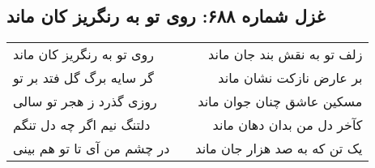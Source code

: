 \begin{center}
\section*{غزل شماره ۶۸۸: روی تو به رنگریز کان ماند}
\label{sec:0688}
\begin{longtable}{l p{0.5cm} r}
روی تو به رنگریز کان ماند
&&
زلف تو به نقش بند جان ماند
\\
گر سایه برگ گل فتد بر تو
&&
بر عارض نازکت نشان ماند
\\
روزی گذرد ز هجر تو سالی
&&
مسکین عاشق چنان جوان ماند
\\
دلتنگ نیم اگر چه دل تنگم
&&
کآخر دل من بدان دهان ماند
\\
در چشم من آی تا تو هم بینی
&&
یک تن که به صد هزار جان ماند
\\
\end{longtable}
\end{center}
